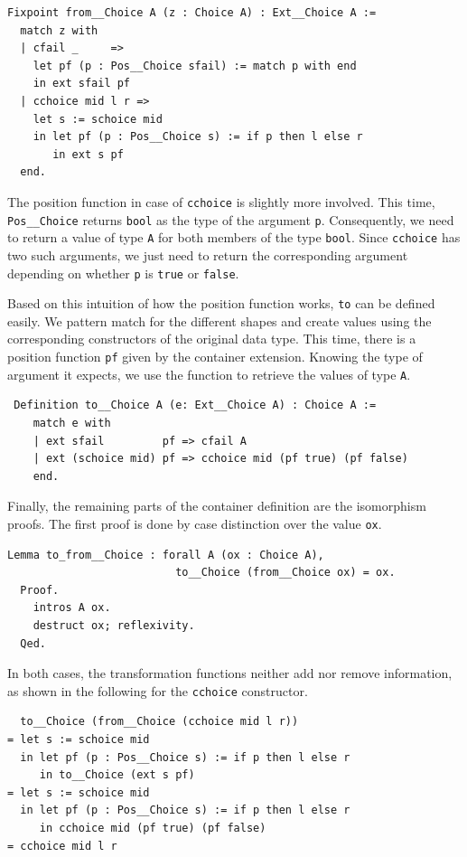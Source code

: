\documentclass[a4paper, 11pt, fleqn, twoside]{scrreprt}
\newcommand{\cinl}[1]{\texttt{#1}}
\begin{document}
\begin{verbatim}
Fixpoint from__Choice A (z : Choice A) : Ext__Choice A :=
  match z with
  | cfail _     =>
    let pf (p : Pos__Choice sfail) := match p with end
    in ext sfail pf
  | cchoice mid l r =>
    let s := schoice mid
    in let pf (p : Pos__Choice s) := if p then l else r
       in ext s pf
  end.
\end{verbatim}

The position function in case of \cinl{cchoice} is slightly more involved.
This time, \cinl{Pos__Choice} returns \cinl{bool} as the type of the argument \cinl{p}.
Consequently, we need to return a value of type \cinl{A} for both members of the type \cinl{bool}.
Since \cinl{cchoice} has two such arguments, we just need to return the corresponding argument depending on whether \cinl{p} is \cinl{true} or \cinl{false}.

Based on this intuition of how the position function works, \cinl{to} can be defined easily.
We pattern match for the different shapes and create values using the corresponding constructors of the original data type.
This time, there is a position function \cinl{pf} given by the container extension.
Knowing the type of argument it expects, we use the function to retrieve the values of type \cinl{A}.

\begin{verbatim}
 Definition to__Choice A (e: Ext__Choice A) : Choice A :=
    match e with
    | ext sfail         pf => cfail A
    | ext (schoice mid) pf => cchoice mid (pf true) (pf false)
    end.
\end{verbatim}

Finally, the remaining parts of the container definition are the isomorphism proofs.
The first proof is done by case distinction over the value \cinl{ox}.

\begin{verbatim}
Lemma to_from__Choice : forall A (ox : Choice A),
                          to__Choice (from__Choice ox) = ox.
  Proof.
    intros A ox.
    destruct ox; reflexivity.
  Qed.
\end{verbatim}

In both cases, the transformation functions neither add nor remove information, as shown in the following for the \cinl{cchoice} constructor.

\begin{verbatim}
  to__Choice (from__Choice (cchoice mid l r))
= let s := schoice mid
  in let pf (p : Pos__Choice s) := if p then l else r
     in to__Choice (ext s pf)
= let s := schoice mid
  in let pf (p : Pos__Choice s) := if p then l else r
     in cchoice mid (pf true) (pf false)
= cchoice mid l r
\end{verbatim}
\end{document}
